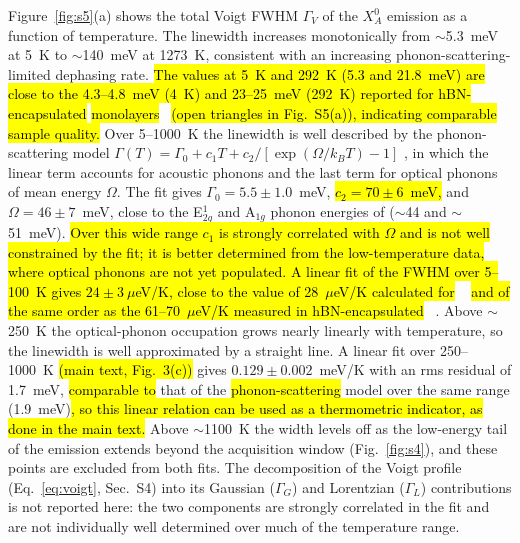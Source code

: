 \documentclass[letterpaper]{article}
\DeclareRobustCommand{\rev}[1]{#1}
\DeclareRobustCommand{\revB}[1]{\hl{#1}}
\begin{document}
Figure~\ref{fig:s5}(a) shows the total Voigt FWHM $\Gamma_V$ of the $X_A^0$
emission as a function of temperature. The linewidth increases monotonically
from $\sim$5.3~meV at 5~K to $\sim$140~meV at 1273~K, consistent with an
increasing phonon-scattering-limited dephasing rate. \revB{The values at 5~K
and 292~K (5.3 and 21.8~meV) are close to the 4.3--4.8~meV (4~K) and
23--25~meV (292~K) reported for hBN-encapsulated}  \revB{monolayers}~\cite{cadiz-2017}
\revB{(open triangles in Fig.~S5(a)), indicating comparable sample quality.} \rev{Over 5--1000~K the linewidth
is well described by the phonon-scattering model
$\Gamma(T) = \Gamma_0 + c_1 T + c_2/[\exp(\Omega/k_BT) - 1]$}
\cite{selig-2016,moody-2015}\rev{, in which the linear term accounts for
acoustic phonons and the last term for optical phonons of mean energy $\Omega$.
The fit gives $\Gamma_0 = 5.5 \pm 1.0$~meV, \revB{$c_2 = 70 \pm 6$~meV,} and $\Omega = 46 \pm 7$~meV, close
to the E$^1_{2g}$ and A$_{1g}$ phonon energies of}  \rev{($\sim$44 and
$\sim$51~meV). \revB{Over this wide range $c_1$ is strongly correlated with
$\Omega$ and is not well constrained by the fit; it is better determined from
the low-temperature data, where optical phonons are not yet populated. A linear
fit of the FWHM over 5--100~K gives $24 \pm 3~\mu$eV/K, close to the value of
28~$\mu$eV/K calculated for} \ce{WS2}~\cite{selig-2016} \revB{and of the same
order as the 61--70~$\mu$eV/K measured in hBN-encapsulated} \ce{MoS2}~\cite{cadiz-2017}. Above
$\sim$250~K the optical-phonon occupation grows nearly linearly with
temperature, so the linewidth is well approximated by a straight line. A
linear fit over 250--1000~K \revB{(main text, Fig.~3(c))} gives $0.129 \pm 0.002$~meV/K with an rms residual
of 1.7~meV, \revB{comparable to} that of the \revB{phonon-scattering} model over the same range
(1.9~meV)\revB{, so this linear relation can be used as a thermometric
indicator, as done in the main text.} Above $\sim$1100~K the width levels off as the low-energy tail of the
emission extends beyond the acquisition window} (Fig.~\ref{fig:s4})\rev{, and
these points are excluded from both fits.} The decomposition of
the \rev{Voigt} profile (Eq.~\ref{eq:voigt}, Sec.~S4) into its Gaussian
($\Gamma_G$) and Lorentzian ($\Gamma_L$) contributions is not reported here:
the two components are strongly correlated in the fit and are not
individually well determined over much of the temperature range.
\end{document}
